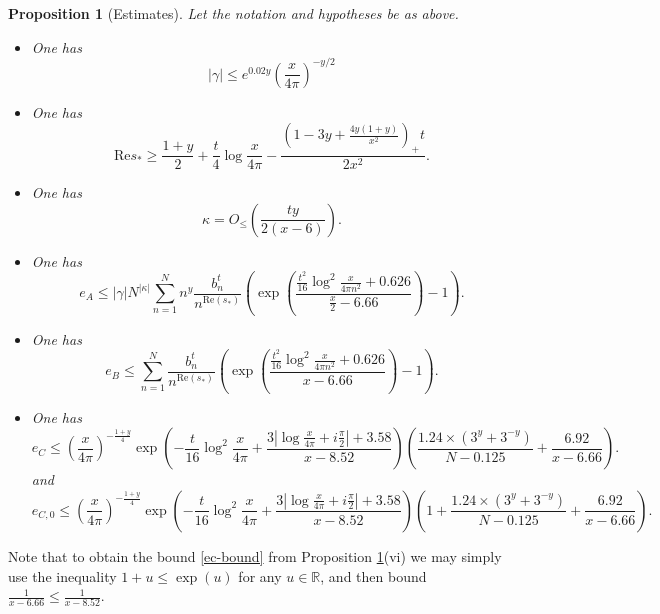 \documentclass[a4paper,11pt,twoside]{amsart}
\newtheorem{proposition}[theorem]{Proposition}
\newcommand\R{\mathbb{R}}
\begin{document}
\begin{proposition}[Estimates]\label{estimates}  Let the notation and hypotheses be as above. 
\begin{itemize}
\item[(i)]  One has
$$ |\gamma| \leq e^{0.02 y} \left( \frac{x}{4\pi} \right)^{-y/2} $$
\item[(ii)] One has
$$ \mathrm{Re} s_* \geq \frac{1+y}{2} +\frac{t}{4} \log \frac{x}{4\pi} - \frac{(1-3y+\frac{4y(1+y)}{x^2})_+ t}{2x^2}.$$
\item[(iii)]  One has
$$ \kappa = O_{\leq} \left( \frac{ty}{2(x-6)} \right).$$
\item[(iv)]  One has
$$ e_A \leq |\gamma| N^{|\kappa|} \sum_{n=1}^N n^{y} \frac{b_n^t}{n^{\mathrm{Re}(s_*)}} \left( \exp\left( \frac{\frac{t^2}{16} \log^2 \frac{x}{4\pi n^2} + 0.626}{\frac{x}{2}-6.66} \right)-1 \right).$$
\item[(v)]  One has
$$ e_B \leq \sum_{n=1}^N  \frac{b_n^t}{n^{\mathrm{Re}(s_*)}} \left( \exp\left( \frac{\frac{t^2}{16} \log^2 \frac{x}{4\pi n^2} + 0.626}{x-6.66} \right)-1 \right).$$
\item[(vi)] One has
$$ e_{C} \leq \left(\frac{x}{4\pi}\right)^{-\frac{1+y}{4}} \exp\left( - \frac{t}{16} \log^2 \frac{x}{4\pi} + \frac{3 |\log \frac{x}{4\pi} + i \frac{\pi}{2}|+3.58}{x-8.52} \right) \left(\frac{1.24 \times (3^y+3^{-y})}{N-0.125} + \frac{6.92}{x-6.66}\right).
$$
and
$$ e_{C,0} \leq \left(\frac{x}{4\pi}\right)^{-\frac{1+y}{4}} \exp\left( - \frac{t}{16} \log^2 \frac{x}{4\pi} + \frac{3 |\log \frac{x}{4\pi} + i \frac{\pi}{2}|+3.58}{x-8.52} \right) \left(1 + \frac{1.24 \times (3^y+3^{-y})}{N-0.125} + \frac{6.92}{x-6.66}\right).
$$
\end{itemize}
\end{proposition}

Note that to obtain the bound \eqref{ec-bound} from Proposition \ref{estimates}(vi) we may simply use the inequality $1+u \leq \exp(u)$ for any $u \in \R$, and then bound $\frac{1}{x-6.66} \leq \frac{1}{x-8.52}$.
\end{document}
